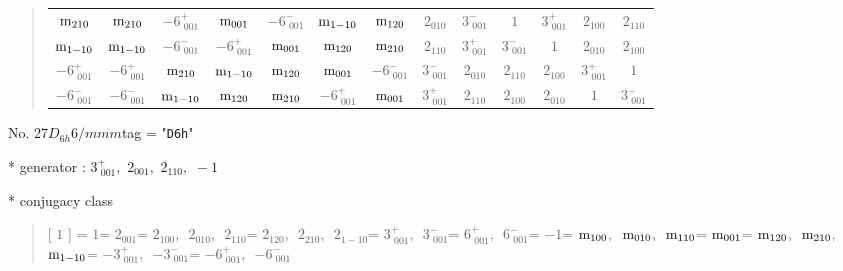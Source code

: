 \documentclass[fleqn,10pt,landscape]{jsarticle}
\begin{document}
\begin{quote}
\begin{tabular}{ccccccccccccc}
$ {\rm m}_{210} $ & $ {\rm m}_{210} $ & $ -6^{+}_{\,\,001} $ & $ {\rm m}_{001} $ & $ -6^{-}_{\,\,001} $ & $ {\rm m}_{1-10} $ & $ {\rm m}_{120} $ & $ 2{}_{010} $ & $ 3^{-}_{\,\,001} $ & $ 1 $ & $ 3^{+}_{\,\,001} $ & $ 2{}_{100} $ & $ 2{}_{110} $ \\
$ {\rm m}_{1-10} $ & $ {\rm m}_{1-10} $ & $ -6^{-}_{\,\,001} $ & $ -6^{+}_{\,\,001} $ & $ {\rm m}_{001} $ & $ {\rm m}_{120} $ & $ {\rm m}_{210} $ & $ 2{}_{110} $ & $ 3^{+}_{\,\,001} $ & $ 3^{-}_{\,\,001} $ & $ 1 $ & $ 2{}_{010} $ & $ 2{}_{100} $ \\
$ -6^{+}_{\,\,001} $ & $ -6^{+}_{\,\,001} $ & $ {\rm m}_{210} $ & $ {\rm m}_{1-10} $ & $ {\rm m}_{120} $ & $ {\rm m}_{001} $ & $ -6^{-}_{\,\,001} $ & $ 3^{-}_{\,\,001} $ & $ 2{}_{010} $ & $ 2{}_{110} $ & $ 2{}_{100} $ & $ 3^{+}_{\,\,001} $ & $ 1 $ \\
$ -6^{-}_{\,\,001} $ & $ -6^{-}_{\,\,001} $ & $ {\rm m}_{1-10} $ & $ {\rm m}_{120} $ & $ {\rm m}_{210} $ & $ -6^{+}_{\,\,001} $ & $ {\rm m}_{001} $ & $ 3^{+}_{\,\,001} $ & $ 2{}_{110} $ & $ 2{}_{100} $ & $ 2{}_{010} $ & $ 1 $ & $ 3^{-}_{\,\,001} $ \\
 \hline \hline
\end{tabular}
\end{quote}

\newpage

No. 27\quad$D_{6h}$\quad$6/mmm$\quad[ hexagonal ]
tag = "{\tt D6h}"

* generator : $3^{+}_{\,\,001},\,\,2{}_{001},\,\,2{}_{110},\,\,-1$

* conjugacy class
\begin{quote}
[ $1$ ] = \quad $1$\newline[ $2{}_{001}$ ] = \quad $2{}_{001}$\newline[ $2{}_{100}$ ] = \quad $2{}_{100}$,\,\, $2{}_{010}$,\,\, $2{}_{110}$\newline[ $2{}_{120}$ ] = \quad $2{}_{120}$,\,\, $2{}_{210}$,\,\, $2{}_{1-10}$\newline[ $3^{+}_{\,\,001}$ ] = \quad $3^{+}_{\,\,001}$,\,\, $3^{-}_{\,\,001}$\newline[ $6^{+}_{\,\,001}$ ] = \quad $6^{+}_{\,\,001}$,\,\, $6^{-}_{\,\,001}$\newline[ $-1$ ] = \quad $-1$\newline[ ${\rm m}_{100}$ ] = \quad ${\rm m}_{100}$,\,\, ${\rm m}_{010}$,\,\, ${\rm m}_{110}$\newline[ ${\rm m}_{001}$ ] = \quad ${\rm m}_{001}$\newline[ ${\rm m}_{120}$ ] = \quad ${\rm m}_{120}$,\,\, ${\rm m}_{210}$,\,\, ${\rm m}_{1-10}$\newline[ $-3^{+}_{\,\,001}$ ] = \quad $-3^{+}_{\,\,001}$,\,\, $-3^{-}_{\,\,001}$\newline[ $-6^{+}_{\,\,001}$ ] = \quad $-6^{+}_{\,\,001}$,\,\, $-6^{-}_{\,\,001}$\newline
\end{quote}
\end{document}
